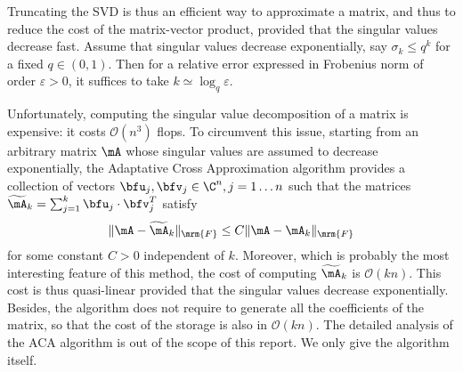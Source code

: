 Truncating the SVD is thus an efficient way to approximate a matrix, and thus to reduce the cost of the 
matrix-vector product, provided that  the singular values decrease fast. Assume that singular values decrease 
exponentially, say $\sigma_{k}\leq q^{k}$ for a fixed $q\in (0,1)$. Then for a relative error expressed in Frobenius norm of order $\varepsilon>0$,  
it suffices to take $k \simeq \log_q \varepsilon$. 

\bigskip
Unfortunately, computing the singular value decomposition  of a matrix is expensive: it costs $\mathcal{O}(n^{3})$ flops. To circumvent this issue, starting from 
an arbitrary matrix $\mA$ whose singular values are assumed to decrease exponentially, the Adaptative 
Cross Approximation algorithm provides a collection of vectors $\bfu_{j},\bfv_{j}\in \C^{n}, j=1\dots n$ such that 
the matrices $\widetilde{\mA}_{k} = \sum_{j=1}^{k}\bfu_{j}\cdot\bfv_{j}^{T}$ satisfy 
$$
\Vert \mA - \widetilde{\mA}_{k}\Vert_{\mrm{F}}\leq C \Vert \mA - \mA_{k}\Vert_{\mrm{F}}
$$
for some constant $C>0$ independent of $k$. Moreover, which is probably the most interesting feature of this method, 
the cost of computing $\widetilde{\mA}_{k}$ is $\mathcal{O}(kn)$. This cost is thus quasi-linear provided that the singular 
values  decrease exponentially. Besides, the algorithm does not require to generate all the coefficients of the matrix, so that the cost of the storage is also in $\mathcal{O}(kn)$. The detailed analysis of the ACA algorithm is out of the scope of this report. We only 
give the algorithm itself.


